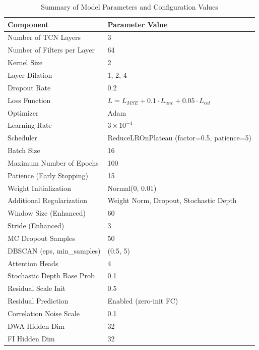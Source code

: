 \begin{table}[h!]
\centering
\caption{Summary of Model Parameters and Configuration Values}
\label{table:parameter_model}
\begin{tabularx}{\linewidth}{lX}
\toprule
\textbf{Component} & \textbf{Parameter Value} \\
\midrule
Number of TCN Layers & 3 \\
Number of Filters per Layer & 64 \\
Kernel Size & 2 \\
Layer Dilation & 1, 2, 4 \\
Dropout Rate & 0.2 \\
Loss Function & $L = L_{MSE} + 0.1 \cdot L_{unc} + 0.05 \cdot L_{cal}$ \\
Optimizer & Adam \\
Learning Rate & $3 \times 10^{-4}$ \\
Scheduler & ReduceLROnPlateau (factor=0.5, patience=5) \\
Batch Size & 16 \\
Maximum Number of Epochs & 100 \\
Patience (Early Stopping) & 15 \\
Weight Initialization & Normal(0, 0.01) \\
Additional Regularization & Weight Norm, Dropout, Stochastic Depth \\
Window Size (Enhanced) & 60 \\
Stride (Enhanced) & 3 \\
MC Dropout Samples & 50 \\
DBSCAN (eps, min\_samples) & (0.5, 5) \\
Attention Heads & 4 \\
Stochastic Depth Base Prob & 0.1 \\
Residual Scale Init & 0.5 \\
Residual Prediction & Enabled (zero-init FC) \\
Correlation Noise Scale & 0.1 \\
DWA Hidden Dim & 32 \\
FI Hidden Dim & 32 \\
\bottomrule
\end{tabularx}
\end{table}